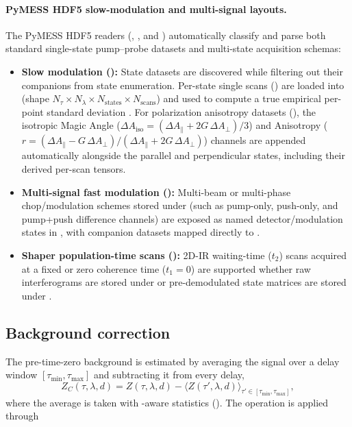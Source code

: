 \paragraph{PyMESS HDF5 slow-modulation and multi-signal layouts.}
The PyMESS HDF5 readers (, , and ) automatically classify and parse both standard single-state pump--probe datasets and multi-state acquisition schemas:
\begin{itemize}
  \item \textbf{Slow modulation ():} State datasets are discovered while filtering out their  companions from state enumeration. Per-state single scans () are loaded into  (shape $N_\tau \times N_\lambda \times N_{\text{states}} \times N_{\text{scans}}$) and used to compute a true empirical per-point standard deviation . For polarization anisotropy datasets (), the isotropic Magic Angle ($\Delta A_{\mathrm{iso}} = (\Delta A_\parallel + 2G\,\Delta A_\perp)/3$) and Anisotropy ($r = (\Delta A_\parallel - G\,\Delta A_\perp)/(\Delta A_\parallel + 2G\,\Delta A_\perp)$) channels are appended automatically alongside the parallel and perpendicular states, including their derived per-scan tensors.
  \item \textbf{Multi-signal fast modulation ():} Multi-beam or multi-phase chop/modulation schemes stored under  (such as pump-only, push-only, and pump+push difference channels) are exposed as named detector/modulation states in , with companion  datasets mapped directly to .
  \item \textbf{Shaper population-time scans ():} 2D-IR waiting-time ($t_2$) scans acquired at a fixed or zero coherence time ($t_1 = 0$) are supported whether raw interferograms are stored under  or pre-demodulated state matrices are stored under .
\end{itemize}

\subsection{Background correction}
The pre-time-zero background is estimated by averaging the signal over a delay
window $[\tau_\mathrm{min},\tau_\mathrm{max}]$ and subtracting it from every
delay,
\begin{equation}
  Z_C(\tau,\lambda,d) = Z(\tau,\lambda,d)
    - \big\langle Z(\tau',\lambda,d) \big\rangle_{\tau' \in [\tau_\mathrm{min},\tau_\mathrm{max}]},
\end{equation}
where the average is taken with -aware statistics
(). The operation is applied through

